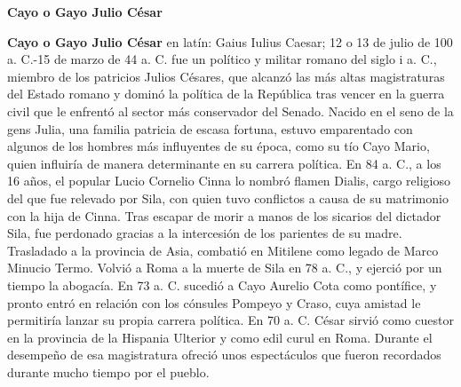 \documentclass{article}
\begin{document}
\begin{center}
\textbf{Cayo o Gayo Julio César}
\end{center}

\begin{justify}
\textbf{Cayo o Gayo Julio César} en latín: Gaius Iulius Caesar; 12 o 13 de julio de 100 a. C.-15 de marzo de 44 a. C. fue un político y militar romano del siglo i a. C., miembro de los patricios Julios Césares, que alcanzó las más altas magistraturas del Estado romano y dominó la política de la República tras vencer en la guerra civil que le enfrentó al sector más conservador del Senado. Nacido en el seno de la gens Julia, una familia patricia de escasa fortuna, estuvo emparentado con algunos de los hombres más influyentes de su época, como su tío Cayo Mario, quien influiría de manera determinante en su carrera política. En 84 a. C., a los 16 años, el popular Lucio Cornelio Cinna lo nombró flamen Dialis, cargo religioso del que fue relevado por Sila, con quien tuvo conflictos a causa de su matrimonio con la hija de Cinna. Tras escapar de morir a manos de los sicarios del dictador Sila, fue perdonado gracias a la intercesión de los parientes de su madre. Trasladado a la provincia de Asia, combatió en Mitilene como legado de Marco Minucio Termo. Volvió a Roma a la muerte de Sila en 78 a. C., y ejerció por un tiempo la abogacía. En 73 a. C. sucedió a Cayo Aurelio Cota como pontífice, y pronto entró en relación con los cónsules Pompeyo y Craso, cuya amistad le permitiría lanzar su propia carrera política. En 70 a. C. César sirvió como cuestor en la provincia de la Hispania Ulterior y como edil curul en Roma. Durante el desempeño de esa magistratura ofreció unos espectáculos que fueron recordados durante mucho tiempo por el pueblo.
\end{justify}
\end{document}
